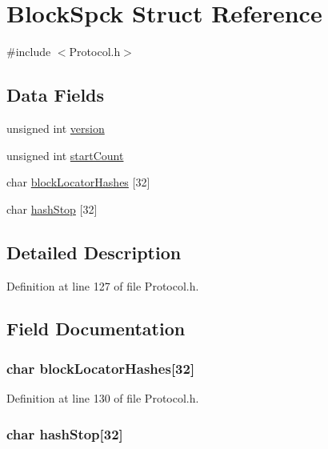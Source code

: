 \hypertarget{struct_block_spck}{
\section{BlockSpck Struct Reference}
\label{struct_block_spck}
}


{\ttfamily \#include $<$Protocol.h$>$}

\subsection*{Data Fields}
\begin{DoxyCompactItemize}
\item 
unsigned int \hyperlink{struct_block_spck_a5408ac5df4c170828874e1b10b4c35a0}{version}
\item 
unsigned int \hyperlink{struct_block_spck_a8063bd9a895b61caa30d0ca876a6e300}{startCount}
\item 
char \hyperlink{struct_block_spck_a95789ecf55183a47b1668d549ba4a927}{blockLocatorHashes} \mbox{[}32\mbox{]}
\item 
char \hyperlink{struct_block_spck_aa16ea670ce42c626f461fc49f74ddcd3}{hashStop} \mbox{[}32\mbox{]}
\end{DoxyCompactItemize}


\subsection{Detailed Description}


Definition at line 127 of file Protocol.h.



\subsection{Field Documentation}
\hypertarget{struct_block_spck_a95789ecf55183a47b1668d549ba4a927}{
\subsubsection[{blockLocatorHashes}]{\setlength{\rightskip}{0pt plus 5cm}char {\bf blockLocatorHashes}\mbox{[}32\mbox{]}}}
\label{struct_block_spck_a95789ecf55183a47b1668d549ba4a927}


Definition at line 130 of file Protocol.h.

\hypertarget{struct_block_spck_aa16ea670ce42c626f461fc49f74ddcd3}{
\subsubsection[{hashStop}]{\setlength{\rightskip}{0pt plus 5cm}char {\bf hashStop}\mbox{[}32\mbox{]}}}
\label{struct_block_spck_aa16ea670ce42c626f461fc49f74ddcd3}


